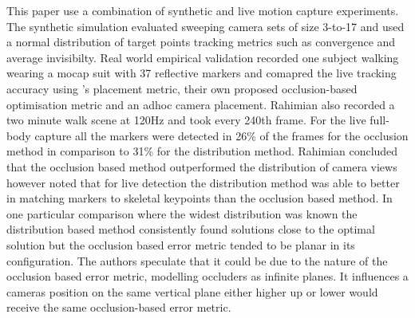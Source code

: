 This paper use a combination of synthetic and live motion capture experiments. The synthetic simulation evaluated sweeping camera sets of size 3-to-17 and used a normal distribution of target points tracking metrics such as convergence and average invisibilty. Real world empirical validation recorded one subject walking wearing a mocap suit with 37 reflective markers and comapred the live tracking accuracy using \citet{chen2008occlusion}'s placement metric, their own proposed occlusion-based optimisation  metric and an adhoc camera placement.
Rahimian also recorded a two minute walk scene at 120Hz and took every 240th frame. For the live full-body capture all the markers were detected in 26\% of the frames for the occlusion method in comparison to 31\% for the distribution method.
Rahimian concluded that the occlusion based method outperformed the distribution of camera views however noted that for live detection the distribution method was able to better in matching markers to skeletal keypoints than the occlusion based method.
In one particular comparison where the widest distribution was known the distribution based method consistently found solutions close to the optimal solution but the occlusion based error metric tended to be planar in its configuration. The authors speculate that it could be due to the nature of the occlusion based error metric, modelling occluders as infinite planes. It influences a cameras position on the same vertical plane either higher up or lower would receive the same occlusion-based error metric.
